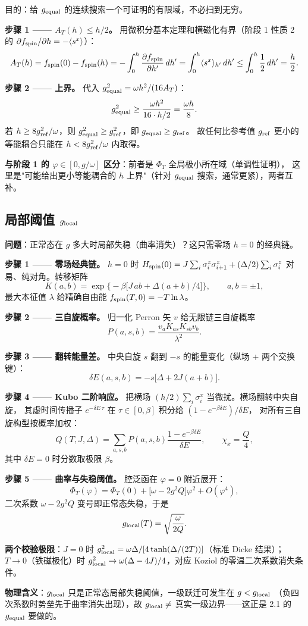\documentclass[UTF8,11pt,a4paper]{ctexart}
\begin{document}
目的：给 $g_{\rm equal}$ 的连续搜索一个可证明的有限域，不必扫到无穷。

\textbf{步骤 1 —— $A_T(h)\le h/2$。} 用微积分基本定理和横磁化有界（阶段 1 性质 2 的
$\partial f_{\rm spin}/\partial h=-\langle s^x\rangle$）：
\[
A_T(h)=f_{\rm spin}(0)-f_{\rm spin}(h)=-\int_0^h\frac{\partial f_{\rm spin}}{\partial h'}\,dh'
=\int_0^h\langle s^x\rangle_{h'}\,dh'\le\int_0^h\frac12\,dh'=\frac h2.
\]

\textbf{步骤 2 —— 上界。} 代入 $g_{\rm equal}^2=\omega h^2/(16A_T)$：
\[
g_{\rm equal}^2\ge\frac{\omega h^2}{16\cdot h/2}=\frac{\omega h}{8}.
\]
若 $h\ge8g_{\rm ref}^2/\omega$，则 $g_{\rm equal}^2\ge g_{\rm ref}^2$，即 $g_{\rm equal}\ge g_{\rm ref}$。
故任何比参考值 $g_{\rm ref}$ 更小的等能耦合只能在 $h<8g_{\rm ref}^2/\omega$ 内取得。

\textbf{与阶段 1 的 $\varphi\in[0,g/\omega]$ 区分}：前者是 $\Phi_T$ 全局极小所在域（单调性证明），
这里是"可能给出更小等能耦合的 $h$ 上界"（针对 $g_{\rm equal}$ 搜索，通常更紧），两者互补。

\subsection{局部阈值 $g_{\rm local}$}

\textbf{问题}：正常态在 $g$ 多大时局部失稳（曲率消失）？这只需零场 $h=0$ 的经典链。

\textbf{步骤 1 —— 零场经典链。} $h=0$ 时 $H_{\rm spin}(0)=J\sum_i\sigma_i^z\sigma_{i+1}^z
+(\Delta/2)\sum_i\sigma_i^z$ 对易、纯对角。转移矩阵
\[
K(a,b)=\exp\big\{-\beta\big[J\,ab+\Delta(a+b)/4\big]\big\},\qquad a,b=\pm1,
\]
最大本征值 $\lambda$ 给精确自由能 $f_{\rm spin}(T,0)=-T\ln\lambda$。

\textbf{步骤 2 —— 三自旋概率。} 归一化 Perron 矢 $v$ 给无限链三自旋概率
\[
P(a,s,b)=\frac{v_a K_{as}K_{sb}v_b}{\lambda^2}.
\]

\textbf{步骤 3 —— 翻转能量差。} 中央自旋 $s$ 翻到 $-s$ 的能量变化（纵场 + 两个交换键）：
\[
\delta E(a,s,b)=-s\big[\Delta+2J(a+b)\big].
\]

\textbf{步骤 4 —— Kubo 二阶响应。} 把横场 $(h/2)\sum_i\sigma_i^x$ 当微扰。横场翻转中央自旋，
其虚时间传播子 $e^{-\delta E\,\tau}$ 在 $\tau\in[0,\beta]$ 积分给 $(1-e^{-\beta\delta E})/\delta E$，
对所有三自旋构型按概率加权：
\[
Q(T,J,\Delta)=\sum_{a,s,b}P(a,s,b)\frac{1-e^{-\beta\delta E}}{\delta E},\qquad \chi_x=\frac Q4,
\]
其中 $\delta E=0$ 时分数取极限 $\beta$。

\textbf{步骤 5 —— 曲率与失稳阈值。} 腔泛函在 $\varphi=0$ 附近展开：
\[
\Phi_T(\varphi)=\Phi_T(0)+\big[\omega-2g^2Q\big]\varphi^2+O(\varphi^4),
\]
二次系数 $\omega-2g^2Q$ 变号即正常态失稳，于是
\[
g_{\rm local}(T)=\sqrt{\frac{\omega}{2Q}}.
\]

\textbf{两个校验极限}：$J=0$ 时 $g_{\rm local}^2=\omega\Delta/[4\tanh(\Delta/(2T))]$（标准 Dicke
结果\cite{Peng2019Unified}）；$T\to0$（铁磁极化）时 $g_{\rm local}^2\to\omega(\Delta-4J)/4$，对应
Koziol 的零温二次系数消失条件\cite{Koziol2026Criticality}。

\textbf{物理含义}：$g_{\rm local}$ 只是正常态局部失稳阈值，一级跃迁可发生在 $g<g_{\rm local}$
（负四次系数时势垒先于曲率消失出现），故 $g_{\rm local}\neq$ 真实一级边界——这正是 2.1 的
$g_{\rm equal}$ 要做的。
\end{document}
